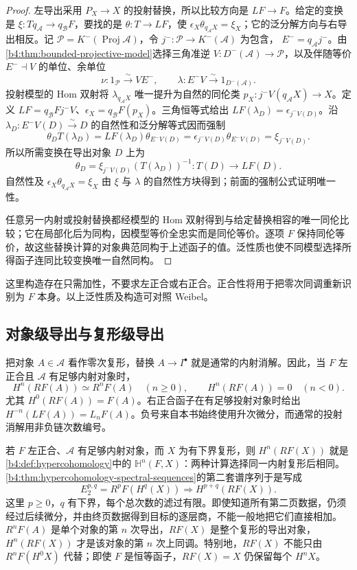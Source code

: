 \begin{proof}
	左导出采用 \(P_X\to X\) 的投射替换，所以比较方向是 \(LF\to F\)。给定的变换是 \(\xi:Tq_{\mathcal A}\to q_{\mathcal B}F\)，要找的是 \(\theta:T\to LF\)，使 \(\epsilon_X\theta_{q_{\mathcal A}X}=\xi_X\)；它的泛分解方向与右导出相反。记 \(\mathcal P=K^-(\operatorname{Proj}\mathcal A)\)，令 \(j^-:\mathcal P\to K^-(\mathcal A)\) 为包含， \(E^-=q_{\mathcal A}j^-\)。由\cref{b4:thm:bounded-projective-model}选择三角准逆 \(V:D^-(\mathcal A)\to\mathcal P\)，以及伴随等价 \(E^-\dashv V\) 的单位、余单位
	\[
		\nu:1_{\mathcal P}\xrightarrow{\sim}VE^-, \qquad \lambda:E^-V\xrightarrow{\sim}1_{D^-(\mathcal A)}.
	\]
	投射模型的 Hom 双射将 \(\lambda_{q_{\mathcal A}X}\) 唯一提升为自然的同伦类 \(p_X:j^-V(q_{\mathcal A}X)\to X\)。定义 \(LF=q_{\mathcal B}Fj^-V\)、\(\epsilon_X=q_{\mathcal B}F(p_X)\)。三角恒等式给出 \(LF(\lambda_D)=\epsilon_{j^-V(D)}\)。沿 \(\lambda_D:E^-V(D)\xrightarrow{\sim}D\) 的自然性和泛分解等式因而强制
	\[
		\theta_D T(\lambda_D) =LF(\lambda_D)\theta_{E^-V(D)} =\epsilon_{j^-V(D)}\theta_{E^-V(D)} =\xi_{j^-V(D)}.
	\]
	所以所需变换在导出对象 \(D\) 上为
	\[
		\theta_D=\xi_{j^-V(D)}(T(\lambda_D))^{-1}: T(D)\longrightarrow LF(D).
	\]
	自然性及 \(\epsilon_X\theta_{q_{\mathcal A}X}=\xi_X\) 由 \(\xi\) 与 \(\lambda\) 的自然性方块得到；前面的强制公式证明唯一性。

	任意另一内射或投射替换都经模型的 Hom 双射得到与给定替换相容的唯一同伦比较；它在局部化后为同构，因模型等价全忠实而是同伦等价。逐项 \(F\) 保持同伦等价，故这些替换计算的对象典范同构于上述函子的值。泛性质也使不同模型选择所得函子连同比较变换唯一自然同构。
\end{proof}

这里构造存在只需加性，不要求左正合或右正合。正合性将用于把零次同调重新识别为 \(F\) 本身。以上泛性质及构造可对照 Weibel\cite[Definition 10.5.1, Existence Theorem 10.5.6]{Weibel1994HomologicalAlgebra}。

\subsection{对象级导出与复形级导出}
\label{b4:subsec:1801:02}

把对象 \(A\in\mathcal A\) 看作零次复形，替换 \(A\to I^\bullet\) 就是通常的内射消解。因此，当 \(F\) 左正合且 \(\mathcal A\) 有足够内射对象时，
\[
	H^n(RF(A))\simeq R^nF(A)\quad(n\ge0),\qquad H^n(RF(A))=0\quad(n<0).
\]
尤其 \(H^0(RF(A))=F(A)\)。右正合函子在有足够投射对象时给出 \(H^{-n}(LF(A))=L_nF(A)\)。负号来自本书始终使用升次微分，而通常的投射消解用非负链次数编号。

\ProseParagraphBreak
若 \(F\) 左正合、\(\mathcal A\) 有足够内射对象，而 \(X\) 为有下界复形，则 \(H^n(RF(X))\) 就是\cref{b4:def:hypercohomology}中的 \(\mathbb H^n(F,X)\)：两种计算选择同一内射复形后相同。\cref{b4:thm:hypercohomology-spectral-sequences}的第二套谱序列于是写成
\[
	E_2^{p,q}=R^pF(H^q(X)) \Longrightarrow H^{p+q}(RF(X)).
\]
这里 \(p\ge0\)，\(q\) 有下界，每个总次数的滤过有限。即使知道所有第二页数据，仍须经过后续微分，并由终页数据得到目标的逐层商，不能一般地把它们直接相加。\(R^nF(A)\) 是单个对象的第 \(n\) 次导出，\(RF(X)\) 是整个复形的导出对象，\(H^n(RF(X))\) 才是该对象的第 \(n\) 次上同调。特别地，\(RF(X)\) 不能只由 \(R^nF(H^0X)\) 代替；即使 \(F\) 是恒等函子，\(RF(X)=X\) 仍保留每个 \(H^nX\)。

